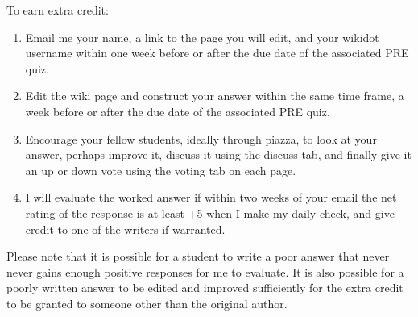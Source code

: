 \documentclass[letterpaper,10pt]{article}
\begin{document}
To earn extra credit:
\begin{enumerate}
    
    \item Email me your name, a link to the page you will edit, and your wikidot username within one week before or after the due date of the associated PRE quiz. 
    
    \item Edit the wiki page and construct your answer within the same time frame, a week before or after the due date of the associated PRE quiz.
    
    \item Encourage your fellow students, ideally through piazza, to look at your answer, perhaps improve it, discuss it using the discuss tab, and finally give it an up or down vote using the voting tab on each page.  
    
    \item I will evaluate the worked answer if within two weeks of your email the net rating of the response is at least +5 when I make my daily check, and give credit to one of the writers if warranted.

\end{enumerate}

Please note that it is possible for a student to write a poor answer that never never gains enough positive responses for me to evaluate.  It is also possible for a poorly written answer to be edited and improved sufficiently for the extra credit to be granted to someone other than the original author.


\end{document}
